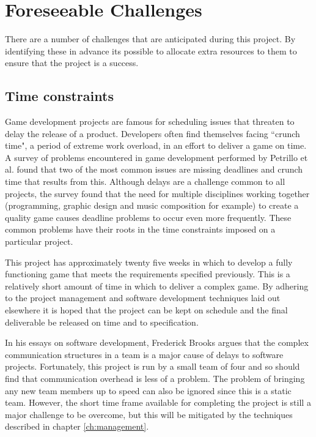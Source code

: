 \section{Foreseeable Challenges}
\label{section:foreseeable_challenges}

There are a number of challenges that are anticipated during this project. By identifying
these in advance its possible to allocate extra resources to them to ensure that the
project is a success.

\subsection{Time constraints}

Game development projects are famous for scheduling issues that threaten to delay the
release of a product. Developers often find themselves facing ``crunch time", a period
of extreme work overload, in an effort to deliver a game on time.\cite[-1em]{groen2011}
A survey of problems encountered in game development performed by Petrillo et al. found
that two of the most common issues are missing deadlines and crunch time that results 
from this.\cite[1em]{petrillo2009} Although delays are a challenge common to all projects,
the survey found that the need for multiple disciplines working together (programming,
graphic design and music composition for example) to create a quality game causes
deadline problems to occur even more frequently. These common problems have their roots
in the time constraints imposed on a particular project.

This project has approximately twenty five weeks in which to develop a fully functioning
game that meets the requirements specified previously. This is a relatively short amount
of time in which to deliver a complex game. By adhering to the project management
and software development techniques laid out elsewhere it is hoped that the project
can be kept on schedule and the final deliverable be released on time and to specification.

In his essays on software development, Frederick Brooks argues that the complex
communication structures in a team is a major cause of delays to software projects.\cite{brooks1995}
Fortunately, this project is run by a small team of four and so should find that
communication overhead is less of a problem. The problem of bringing any new team
members up to speed can also be ignored since this is a static team.
However, the short time frame available for completing the project is still a
major challenge to be overcome, but this will be mitigated by the techniques
described in chapter \ref{ch:management}.

